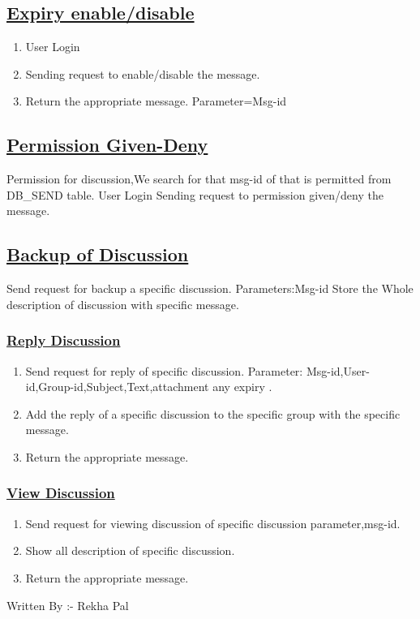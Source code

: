 \documentclass{article}
\begin{document}
\subsection*{\underline{Expiry enable/disable}}
\begin{enumerate}
\item User Login
\item Sending request to enable/disable the message.
\item Return the appropriate message.
Parameter=Msg-id
\begin{center}

\label{figure:Expirydis.latex}
\end{center}
\end{enumerate}
\subsection*{\underline{Permission Given-Deny}}
Permission for discussion,We search for that msg-id of that is permitted from DB\_SEND table.
User Login Sending request to permission given/deny the message.

\label{figure:Permissiondis.latex}
\subsection*{\underline{Backup of Discussion}}

Send request for backup a specific discussion.
Parameters:Msg-id
Store the Whole description of discussion with specific message.

\label{figure:Backupdis.latex}
\subsubsection*{\underline{Reply Discussion}}
\begin{enumerate}
\item Send request for reply of specific discussion.
      Parameter: Msg-id,User-id,Group-id,Subject,Text,attachment any expiry .
\item Add the reply of a specific discussion to the specific group with the specific message.
\item Return the appropriate message.
\begin{center}

\label{figure:Replydis.latex}
\end{center}
\end{enumerate}
\subsubsection*{\underline{View Discussion}}
\begin{enumerate}
\item Send request for viewing discussion of specific discussion parameter,msg-id.
\item Show all description of specific discussion.
\item Return the appropriate message.
\begin{center}

\label{figure:viewdis.latex}
\end{center}
\end{enumerate}
Written By :- Rekha Pal
\end{document}
